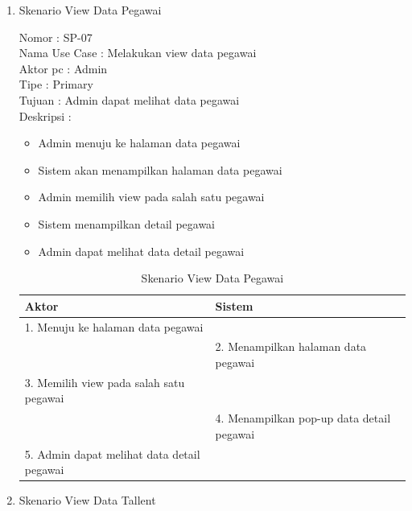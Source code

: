 \begin{enumerate}
\item Skenario View Data Pegawai

Nomor \kern 3.6pc : SP-07 \\
Nama Use Case : Melakukan view data pegawai \\
Aktor  pc : Admin \\
Tipe \kern 4.6pc : Primary \\
Tujuan \kern 3.6pc : Admin dapat melihat data pegawai \\
Deskripsi \kern 2.5pc : 

\begin{itemize}
	\item Admin menuju ke halaman data pegawai
	\item Sistem akan menampilkan halaman data pegawai
	\item Admin memilih view pada salah satu pegawai
	\item Sistem menampilkan detail pegawai
	\item Admin dapat melihat data detail pegawai
	
\end{itemize}

\begin{table}
	\caption{Skenario View Data Pegawai}
	\centering
	\begin{tabular}{ | l | p{55mm} |}
		\hline 
		\textbf{Aktor} & \textbf{Sistem} \\
		\hline
		
		1.	Menuju ke halaman data pegawai &  \\
		
		\hline
		
		&  2.	Menampilkan halaman data pegawai \\
		
		\hline
		
		3. Memilih view pada salah satu pegawai & \\
		
		\hline
		
		& 4.	Menampilkan pop-up data detail pegawai \\
		
		\hline
		
		5.	Admin dapat melihat data detail pegawai  & \\
		\hline
		
		
	\end{tabular}
\end{table}

\item Skenario View Data Tallent


\end{enumerate}
